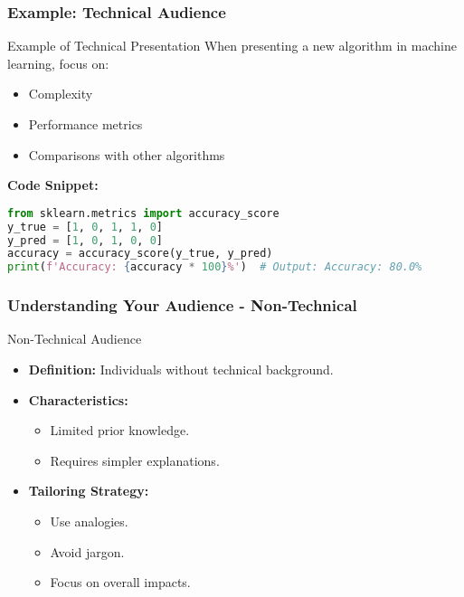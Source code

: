 \documentclass[aspectratio=169]{beamer}
\begin{document}
\begin{frame}[fragile]
    \frametitle{Example: Technical Audience}
    \begin{block}{Example of Technical Presentation}
        When presenting a new algorithm in machine learning, focus on:
        \begin{itemize}
            \item Complexity
            \item Performance metrics
            \item Comparisons with other algorithms
        \end{itemize}
        \textbf{Code Snippet:}
        \begin{lstlisting}[language=Python]
from sklearn.metrics import accuracy_score
y_true = [1, 0, 1, 1, 0]
y_pred = [1, 0, 1, 0, 0]
accuracy = accuracy_score(y_true, y_pred)
print(f'Accuracy: {accuracy * 100}%')  # Output: Accuracy: 80.0%
        \end{lstlisting}
    \end{block}
\end{frame}

\begin{frame}[fragile]
    \frametitle{Understanding Your Audience - Non-Technical}
    \begin{block}{Non-Technical Audience}
        \begin{itemize}
            \item \textbf{Definition:} Individuals without technical background.
            \item \textbf{Characteristics:}
            \begin{itemize}
                \item Limited prior knowledge.
                \item Requires simpler explanations.
            \end{itemize}
            \item \textbf{Tailoring Strategy:} 
            \begin{itemize}
                \item Use analogies.
                \item Avoid jargon.
                \item Focus on overall impacts.
            \end{itemize}
        \end{itemize}
    \end{block}
\end{frame}
\end{document}
